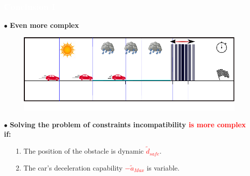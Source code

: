 








\begin{frame}
\frametitle{{\textcolor{white}{\hspace{0.3cm}Conclusion I
}}}
$\bullet$ {\color{red}\textbf{Even more complex}}
\begin{figure}[!ht]
\centering
\includegraphics[width=1.0\linewidth]{figures/car_example_14}
\end{figure}
$\bullet$ \textbf{Solving the problem of constraints incompatibility \textcolor{red}{is more complex} if:}
\begin{itemize}
\addtolength{\itemindent}{5mm}
\item[1.] The position of the obstacle is dynamic \textcolor{red}{$\widetilde{d}_{safe}$}.
\item[2.] The car's deceleration capability \textcolor{red}{$-\widetilde{a}_{Max}$} is variable.
\end{itemize}  
\vspace{5mm}
\end{frame}










